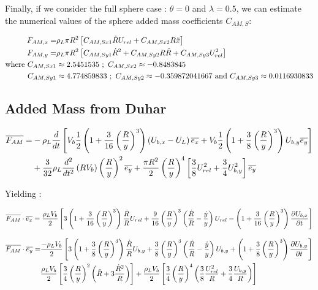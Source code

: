 \npar

Finally, if we consider the full sphere case : $\theta=0$ and $\lambda=0.5$, we can estimate the numerical values of the sphere added mass coefficients $C_{AM,S}$:

\begin{align}
F_{AM,x}=&\rho_{L}\pi R^{2}\left[ C_{AM,Sx1}\dot{R}U_{rel}+C_{AM,Sx2}R\ddot{x} \right]\\
F_{AM,y}=&\rho_{L}\pi R^{2}\left[ C_{AM,Sy1}\dot{R}^{2}+C_{AM,Sy2}R\ddot{R}+C_{AM,Sy3}U_{rel}^{2} \right]\\
\nonumber \text{where}\ C_{AM,Sx1}&\approx 2.5451535\ ;\ C_{AM,Sx2}\approx-0.8483845 \\
\nonumber C_{AM,Sy1}& \approx 4.774859833 \ ; \ C_{AM,Sy2}\approx -0.359872041667\ \text{and}\ C_{AM,Sy3}\approx 0.0116930833
\end{align}


\subsection{Added Mass from Duhar \etal}

\begin{align}
\vect{F_{AM}}=&-\rho_{L}\frac{d}{dt}\crocht{V_{b}\frac{1}{2}\parth{1+\frac{3}{16}\parth{\frac{R}{y}}^{3} } \parth{U_{b,x}-U_{L}} \vect{e_{x}} + V_{b}\frac{1}{2}\parth{1+\frac{3}{8} \parth{\frac{R}{y}}^{3} }U_{b,y}\vect{e_{y}} }\\
%
&+ \frac{3}{32}\rho_{L}\frac{d^{2}}{dt^{2}}\parth{RV_{b}} \parth{\frac{R}{y}}^{2}\vect{e_{y}} + \frac{\pi R^{2}}{2} \parth{\frac{R}{y}}^{4} \crocht{\frac{3}{8}U_{rel}^{2}+\frac{3}{4}U_{b,y}^{2}}\vect{e_{y}}
\end{align}

Yielding :

\begin{align}
\overline{F_{AM}}\cdot \overline{e_{x}} = \frac{\rho_{L}V_{b}}{2}\left[ 3\left( 1+\frac{3}{16}\left( \frac{R}{y} \right)^{3}  \right) \frac{\dot{R}}{R}U_{rel} + \frac{9}{16}\left( \frac{R}{y} \right)^{3}\left( \frac{\dot{R}}{R}-\frac{\dot{y}}{y} \right)U_{rel} - \left( 1+\frac{3}{16}\left( \frac{R}{y} \right)^{3}  \right)\frac{\partial{U_{b,x}}}{\partial t} \right]
\end{align}



\begin{align}
\vect{F_{AM}}\cdot \vect{e_{y}} =& \frac{-\rho_{L}V_{b}}{2}\crocht{3\parth{1+\frac{3}{8}\parth{\frac{R}{y}}^{3} } \frac{\dot{R}}{R}U_{b,y} + \frac{3}{8}\parth{\frac{R}{y}}^{3}\parth{\frac{\dot{R}}{R}-\frac{\dot{y}}{y}}U_{b,y} + \parth{1+\frac{3}{8}\parth{\frac{R}{y}}^{3} }\dtime{U_{b,y}}}\\
%
&\frac{\rho_{L}V_{b}}{2}\crocht{\frac{3}{4} \parth{\frac{R}{y}}^{2}\parth{\ddot{R}+3\frac{\dot{R}^{2}}{R}} } + \frac{\rho_{L}V_{b}}{2} \crocht{\frac{3}{4}\parth{\frac{R}{y}}^{4}\parth{\frac{3}{8}\frac{U_{rel}^{2}}{R} + \frac{3}{4}\frac{U_{b,y}}{R}}}
\end{align}


